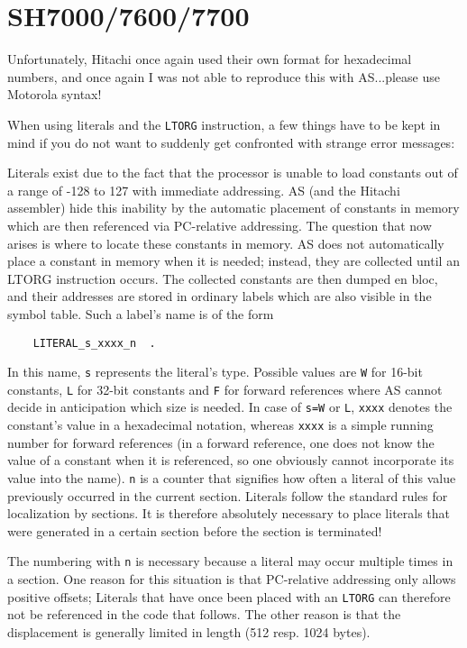 \documentclass[12pt,twoside]{report}
\newcommand{\tty}[1]{{\tt #1}}
\begin{document}

\section{SH7000/7600/7700}

Unfortunately, Hitachi once again used their own format for
hexadecimal numbers, and once again I was not able to reproduce this
with AS...please use Motorola syntax! 

When using literals and the \tty{LTORG} instruction, a few things have to
be kept in mind if you do not want to suddenly get confronted with strange
error messages:

Literals exist due to the fact that the processor is unable to load
constants out of a range of -128 to 127 with immediate addressing. 
AS (and the Hitachi assembler) hide this inability by the automatic
placement of constants in memory which are then referenced via
PC-relative addressing.  The question that now arises is where to
locate these constants in memory.  AS does not automatically place a
constant in memory when it is needed; instead, they are collected
until an LTORG instruction occurs.  The collected constants are then
dumped en bloc, and their addresses are stored in ordinary labels
which are also visible in the symbol table.  Such a label's name is
of the form
\begin{verbatim}
    LITERAL_s_xxxx_n  .
\end{verbatim}
In this name, \tty{s} represents the literal's type.  Possible values are
\tty{W} for 16-bit constants, \tty{L} for 32-bit constants and \tty{F} for
forward references where AS cannot decide in anticipation which size is
needed.  In case of \tty{s=W} or \tty{L}, \tty{xxxx} denotes the
constant's value in a hexadecimal notation, whereas \tty{xxxx} is a simple
running number for forward references (in a forward reference, one does
not know the value of a constant when it is referenced, so one obviously
cannot incorporate its value into the name).  \tty{n} is a counter that
signifies how often a literal of this value previously occurred in the
current section.  Literals follow the standard rules for localization by
sections.  It is therefore absolutely necessary to place literals that
were generated in a certain section before the section is terminated!

The numbering with \tty{n} is necessary because a literal may occur
multiple times in a section.  One reason for this situation is that
PC-relative addressing only allows positive offsets; Literals that
have once been placed with an \tty{LTORG} can therefore not be referenced
in the code that follows.  The other reason is that the displacement
is generally limited in length (512 resp. 1024 bytes).
\end{document}
